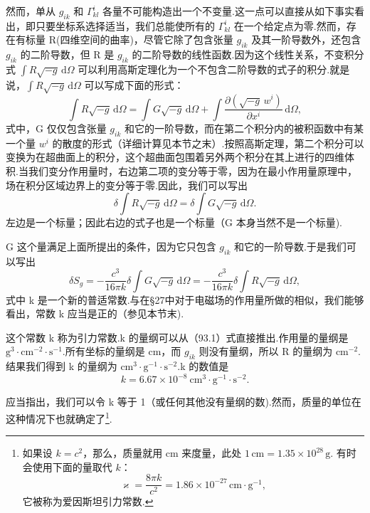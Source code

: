 然而，单从 $g_{ik}$ 和 $\Gamma^i_{kl}$ 各量不可能构造出一个不变量.这一点可以直接从如下事实看出，即只要坐标系选择适当，我们总能使所有的 $\Gamma^i_{kl}$ 在一个给定点为零.然而，存在有标量 R(四维空间的曲率)，尽管它除了包含张量 $g_{ik}$ 及其一阶导数外，还包含 $g_{ik}$ 的二阶导数，但 R 是 $g_{ik}$ 的二阶导数的线性函数.因为这个线性关系，不变积分式 $\int R\sqrt{-g}\,\mathrm{d}\varOmega$ 可以利用高斯定理化为一个不包含二阶导数的式子的积分.就是说，$\int R\sqrt{-g}\,\mathrm{d}\varOmega$ 可以写成下面的形式：
\begin{equation*}
  \int R\sqrt{-g}\,\mathrm{d}\varOmega
  =\int G\sqrt{-g}\,\mathrm{d}\varOmega
  +\int\frac{\partial(\sqrt{-g}\,w^i)}{\partial x^i}\,\mathrm{d}\varOmega,
\end{equation*}
式中，G 仅仅包含张量 $g_{ik}$ 和它的一阶导数，而在第二个积分内的被积函数中有某一个量 $w^i$ 的散度的形式（详细计算见本节之末）.按照高斯定理，第二个积分可以变换为在超曲面上的积分，这个超曲面包围着另外两个积分在其上进行的四维体积.当我们变分作用量时，右边第二项的变分等于零，因为在最小作用量原理中，场在积分区域边界上的变分等于零.因此，我们可以写出
\begin{equation*}
  \delta\int R\sqrt{-g}\,\mathrm{d}\varOmega
  =\delta\int G\sqrt{-g}\,\mathrm{d}\varOmega.
\end{equation*}
左边是一个标量；因此右边的式子也是一个标量（G 本身当然不是一个标量).

G 这个量满足上面所提出的条件，因为它只包含 $g_{ik}$ 和它的一阶导数.于是我们可以写出
\begin{equation}
  \delta S_g=-\frac{c^3}{16\pi k}\delta\int G\sqrt{-g}\,\mathrm{d}\varOmega
  =-\frac{c^3}{16\pi k}\delta\int R\sqrt{-g}\,\mathrm{d}\varOmega,
\end{equation}
式中 k 是一个新的普适常数.与在§27中对于电磁场的作用量所做的相似，我们能够看出，常数 k 应当是正的（参见本节末).

这个常数 k 称为引力常数.k 的量纲可以从（93.1）式直接推出.作用量的量纲是 $\mathrm{g}^3\cdot\mathrm{cm}^{-2}\cdot\mathrm{s}^{-1}$.所有坐标的量纲是 cm，而 $g_{ik}$ 则没有量纲，所以 R 的量纲为 $\mathrm{cm}^{-2}$.结果我们得到 k 的量纲为 $\mathrm{cm}^3\cdot\mathrm{g}^{-1}\cdot\mathrm{s}^{-2}$.k 的数值是
\begin{equation}
  k=6.67\times10^{-8}\ \mathrm{cm}^3\cdot\mathrm{g}^{-1}\cdot\mathrm{s}^{-2}.
\end{equation}

应当指出，我们可以令 k 等于 1（或任何其他没有量纲的数).然而，质量的单位在这种情况下也就确定了\footnote{如果设 $k=c^2$，那么，质量就用 cm 来度量，此处 $1\,\mathrm{cm}=1.35\times10^{28}\,\mathrm{g}$. 有时会使用下面的量取代 $k$：
\begin{equation*}
  \varkappa=\frac{8\pi k}{c^2}=1.86\times10^{-27}\,\mathrm{cm}\cdot\mathrm{g}^{-1},
\end{equation*}
它被称为爱因斯坦引力常数.}.

